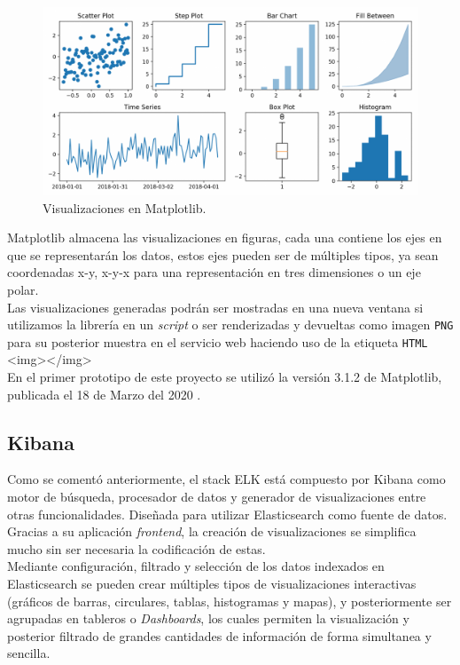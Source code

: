 \documentclass[a4paper, 12pt]{book}
\begin{document}
		\begin{figure}[H]
			\centering
			\includegraphics[width=12cm, keepaspectratio]{img/visualizations_matplotlib.png}
			\caption{Visualizaciones en Matplotlib.}
			\label{fig:visualizations_matplotlib}
		\end{figure}
		
		Matplotlib almacena las visualizaciones en figuras, cada una contiene los ejes en que se representarán los datos, estos ejes pueden ser de múltiples tipos, ya sean coordenadas x-y, x-y-x para una representación en tres dimensiones o un eje polar.\\
		
		Las visualizaciones generadas podrán ser mostradas en una nueva ventana si utilizamos la librería en un \textit{script} o ser renderizadas y devueltas como imagen \texttt{PNG} para su posterior muestra en el servicio web haciendo uso de la etiqueta \texttt{HTML} <img></img>\\
		
		En el primer prototipo de este proyecto se utilizó la versión 3.1.2 de Matplotlib, publicada el 18 de Marzo del 2020 \cite{releases_matplotlib}.
		
	\subsection{Kibana}
	\label{subsec:kibana}
		Como se comentó anteriormente, el stack ELK está compuesto por Kibana \cite{kibana} como motor de búsqueda, procesador de datos y generador de visualizaciones entre otras funcionalidades. Diseñada para utilizar Elasticsearch como fuente de datos.\\
		
		Gracias a su aplicación \textit{frontend}, la creación de visualizaciones se simplifica mucho sin ser necesaria la codificación de estas. \\
		
		Mediante configuración, filtrado y selección de los datos indexados en Elasticsearch se pueden crear múltiples tipos de visualizaciones interactivas (gráficos de barras,  circulares, tablas, histogramas y mapas), y posteriormente ser agrupadas en tableros o \textit{Dashboards}, los cuales permiten la visualización y posterior filtrado de grandes cantidades de información de forma simultanea y sencilla.\\
		
\end{document}
